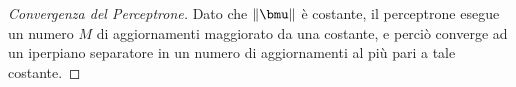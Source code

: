 \documentclass[\main/main.tex]{subfiles}
\begin{document}
\begin{proof}[Convergenza del Perceptrone]
    Dato che \(\norm{\bmu}\) è costante, il perceptrone esegue un numero \(M\) di aggiornamenti maggiorato da una costante, e perciò converge ad un iperpiano separatore in un numero di aggiornamenti al  più pari a tale costante.
\end{proof}
\end{document}
